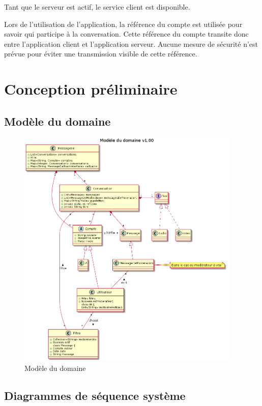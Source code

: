 \documentclass[11pt,dvipsnames,svgnames]{report}
\begin{document}
Tant que le serveur est actif, le service client est disponible.

Lors de l'utilisation de l'application, la référence du compte est utilisée pour savoir qui participe à la conversation. Cette référence du compte transite donc entre l'application client et l'application serveur. Aucune mesure de sécurité n'est prévue pour éviter une transmission visible de cette référence.\\

\chapter{Conception préliminaire}

\section{Modèle du domaine}

\begin{figure}[H]
\centerline{\includegraphics[width=0.95\textwidth]{diagrammes/class-diag.png}}
\caption{Modèle du domaine}
\end{figure}

\section{Diagrammes de séquence système}
\end{document}
